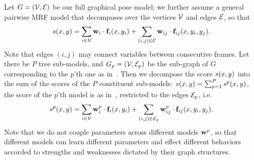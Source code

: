 Let $G = (\mathcal{V},\mathcal{E})$ be our full graphical
pose model; we further assume a general pairwise MRF model that decomposes over 
the vertices $\mathcal{V}$ and edges $\mathcal{E}$, so that
\begin{equation}
  \label{eq:loopy-model}
  s(x,y) = \sum_{i \in \mathcal{V}}\mathbf{w}_i \cdot \mathbf{f}_i(x,y_i) + \sum_{(i,j) \in \mathcal{E}}\mathbf{w}_{ij} 
\cdot \mathbf{f}_{ij}(x,y_i,y_j).  \end{equation}
Note that edges $(i,j)$ may connect variables between consecutive
frames. Let there be $P$ tree sub-models, and $G_p = (\mathcal{V}, \mathcal{E}_p)$ be the sub-graph of $G$ corresponding
to the $p$'th one as in~.  Then
we decompose the score $s(x,y)$ into the sum of the scores of the
$P$ constituent sub-models: $s(x,y) = \sum_{p=1}^P s^p(x,y)$, the
score of the $p$'th model is as in~, restricted to the
edges $\mathcal{E}_p$, i.e. 
\begin{equation}
s^p(x,y) = \sum_{i\in\mathcal{V}}\mathbf{w}_i^p \cdot \mathbf{f}_i(x,y_i) + 
\sum_{(i,j)\in\mathcal{E}_p}\mathbf{w}_{ij}^p \cdot \mathbf{f}_{ij}(x,y_i,y_j).
\end{equation}
Note that we do not couple parameters across different models $\mathbf{w}^p$, so that different models can learn different parameters and effect different behaviors accorded to strengths and weaknesses dictated by their graph structures.


